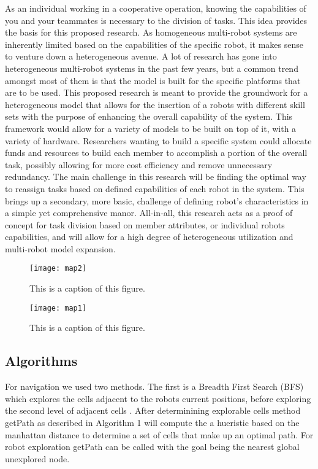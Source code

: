 As an individual working in a cooperative operation, knowing the capabilities
of you and your teammates is necessary to the division of tasks. This idea
provides the basis for this proposed research. As homogeneous multi-robot systems
are inherently limited based on the capabilities of the specific robot,
it makes sense to venture down a heterogeneous avenue. A lot of research
has gone into heterogeneous multi-robot systems in the past few years, but a
common trend amongst most of them is that the model is built for the specific
platforms that are to be used. This proposed research is meant to provide the
groundwork for a heterogeneous model that allows for the insertion of a
robots with different skill sets with the purpose of enhancing the overall
capability of the system. This framework would allow for a variety of models
to be built on top of it, with a variety of hardware. Researchers wanting to
build a specific system could allocate funds and resources to build each member
to accomplish a portion of the overall task, possibly allowing for more cost
efficiency and remove unnecessary redundancy. The main challenge in this
research will be finding the optimal way to reassign tasks based on defined
capabilities of each robot in the system. This brings up a secondary, more basic,
challenge of defining robot’s characteristics in a simple yet comprehensive manor.
All-in-all, this research acts as a proof of concept for task division based on member
attributes, or individual robots capabilities, and will allow for a high degree of
heterogeneous utilization and multi-robot model expansion.

\begin{figure}[H]
  \centering
    \texttt{[image: map2]}
  \caption{This is a caption of this figure.}
  \label{fig:something1}
\end{figure}

\begin{figure}[H]
  \centering
    \texttt{[image: map1]}
  \caption{This is a caption of this figure.}
  \label{fig:something2}
\end{figure}

\subsection{Algorithms}
For navigation we used two methods. The first is a Breadth First Search (BFS) which explores the cells adjacent to the robots
current positions, before exploring the second level of adjacent cells \cite{BFS}. After determinining explorable cells method getPath as described in Algorithm 1 will compute the a hueristic based on the manhattan distance to determine a set of cells that make up an optimal path. For robot exploration getPath can be called with the goal being the nearest global unexplored node.


